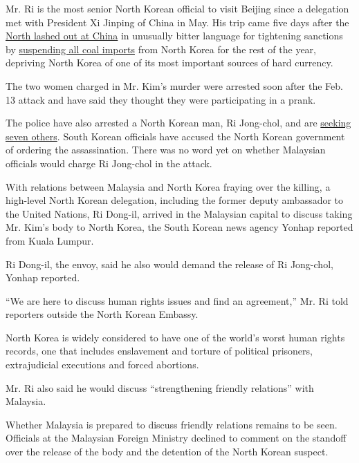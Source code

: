 Mr. Ri is the most senior North Korean official to visit Beijing since a
delegation met with President Xi Jinping of China in May. His trip came
five days after the
\href{https://www.nytimes.com/2017/02/23/world/asia/north-korea-china.html}{North
lashed out at China} in unusually bitter language for tightening
sanctions by
\href{https://www.nytimes.com/2017/02/18/world/asia/north-korea-china-coal-imports-suspended.html}{suspending
all coal imports} from North Korea for the rest of the year, depriving
North Korea of one of its most important sources of hard currency.

The two women charged in Mr. Kim's murder were arrested soon after the
Feb. 13 attack and have said they thought they were participating in a
prank.

The police have also arrested a North Korean man, Ri Jong-chol, and are
\href{https://www.nytimes.com/2017/02/27/world/asia/north-korea-kim-jong-nam-state-security.html?rref=collection\%2Fsectioncollection\%2Fasia\&action=click\&contentCollection=asia\&region=stream\&module=stream_unit\&version=latest\&contentPlacement=7\&pgtype=sectionfront}{seeking
seven others}. South Korean officials have accused the North Korean
government of ordering the assassination. There was no word yet on
whether Malaysian officials would charge Ri Jong-chol in the attack.

With relations between Malaysia and North Korea fraying over the
killing, a high-level North Korean delegation, including the former
deputy ambassador to the United Nations, Ri Dong-il, arrived in the
Malaysian capital to discuss taking Mr. Kim's body to North Korea, the
South Korean news agency Yonhap reported from Kuala Lumpur.

Ri Dong-il, the envoy, said he also would demand the release of Ri
Jong-chol, Yonhap reported.

``We are here to discuss human rights issues and find an agreement,''
Mr. Ri told reporters outside the North Korean Embassy.

North Korea is widely considered to have one of the world's worst human
rights records, one that includes enslavement and torture of political
prisoners, extrajudicial executions and forced abortions.

Mr. Ri also said he would discuss ``strengthening friendly relations''
with Malaysia.

Whether Malaysia is prepared to discuss friendly relations remains to be
seen. Officials at the Malaysian Foreign Ministry declined to comment on
the standoff over the release of the body and the detention of the North
Korean suspect.

